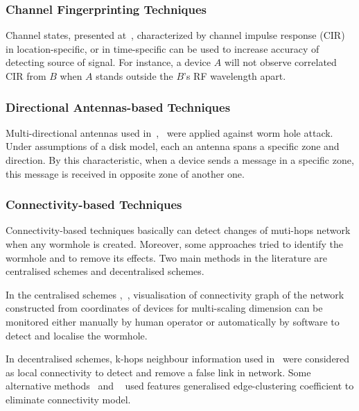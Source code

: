 \subsubsection*{Channel Fingerprinting Techniques}

Channel states, presented at~\cite{4289438, LiangXiao2008,LiangXiao2009,Liu:2009:SWC:1823633}, characterized by channel impulse response (CIR) in location-specific, or in time-specific can be used to increase accuracy of detecting source of signal. For instance, a device $A$ will not observe correlated CIR from $B$ when $A$ stands outside the $B$'s RF wavelength apart.

\subsubsection*{Directional Antennas-based Techniques}

Multi-directional antennas used in~\cite{Hu04usingdirectional},~\cite{RuiZhang2010} were applied against worm hole attack. Under assumptions of a disk model, each an antenna spans a specific zone and direction. By this characteristic, when a device sends a message in a specific zone, this message is received in opposite zone of another one. 

\subsubsection*{Connectivity-based Techniques}

Connectivity-based techniques basically can detect changes of muti-hops network when any wormhole is created. Moreover, some approaches tried to identify the wormhole and to remove its effects. Two main methods in the literature are centralised schemes and decentralised schemes. 

In the centralised schemes \cite{RuiZhang2010},~\cite{WeichaoWang2007}, visualisation of connectivity graph of the network constructed from coordinates of devices for multi-scaling dimension can be monitored either manually by human operator or automatically by software to detect and localise the wormhole. 

In decentralised schemes, k-hops neighbour information used in~\cite{RiteshMaheshwari}\cite{4699583} were considered as local connectivity to detect and remove a false link in network. Some alternative methods~\cite{RiteshMaheshwari} and ~\cite{5993472} used features generalised edge-clustering coefficient to eliminate connectivity model.

